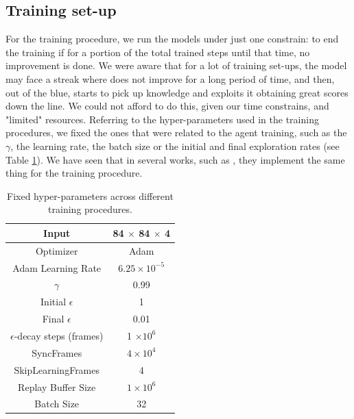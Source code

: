 \subsection{Training set-up}
For the training procedure, we run the models under just one constrain: to end the training if for a portion of the total trained steps until that time, no improvement is done. We were aware that for a lot of training set-ups, the model may face a streak where does not improve for a long period of time, and then, out of the blue, starts to pick up knowledge and exploits it obtaining great scores down the line. We could not afford to do this, given our time constrains, and "limited" resources. Referring to the hyper-parameters used in the training procedures, we fixed the ones that were related to the agent training, such as the $\gamma$, the learning rate, the batch size or the initial and final exploration rates (see Table \ref{tab:hyper-parameters}). We have seen that in several works, such as \cite{vanhasselt2015deep, hessel2017rainbow, meng2024deep}, they implement the same thing for the training procedure.

\begin{table}[!h]
	\begin{center}
		\caption[Fixed hyper-parameters that are shared across different training procedures.]{Fixed hyper-parameters across different training procedures.}
		\label{tab:hyper-parameters}
		\begin{tabular}{||c | c||} 
			\hline
			Input & 84 $\times$ 84 $\times$ 4 \\
			\hline
			Optimizer & Adam \\
			\hline
			Adam Learning Rate & $6.25 \times 10^{-5}$ \\
			\hline
			$\gamma$ & 0.99 \\
			\hline
			Initial $\epsilon$ & 1 \\
			\hline
			Final $\epsilon$ & 0.01 \\
			\hline
			$\epsilon$-decay steps (frames) & 1 $\times 10^6$   \\
			\hline
			SyncFrames & $4 \times 10^4$ \\
			\hline
			SkipLearningFrames & 4 \\
			\hline
			Replay Buffer Size & $1 \times 10^{6}$ \\
			\hline
			Batch Size & 32 \\
			\hline
		\end{tabular}
	\end{center}
\end{table}

